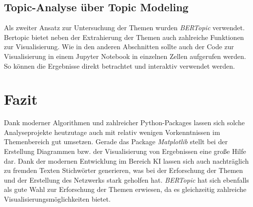 \documentclass[12pt]{article}
\begin{document}
\begin{sloppypar}
	

	\subsection{Topic-Analyse über Topic Modeling}

	Als zweiter Ansatz zur Untersuchung der Themen wurden \emph{BERTopic}
	verwendet. Bertopic bietet neben der Extrahierung der Themen auch zahlreiche
	Funktionen zur Visualisierung. Wie in den anderen Abschnitten sollte auch
	der Code zur Visualisierung in einem Jupyter Notebook in einzelnen Zellen
	aufgerufen werden. So können die Ergebnisse direkt betrachtet und interaktiv
	verwendet werden.

	

    \newpage
	\section{Fazit}

	Dank moderner Algorithmen und zahlreicher Python-Packages lassen sich solche
	Analyseprojekte heutzutage auch mit relativ wenigen Vorkenntnissen im
	Themenbereich gut umsetzen. Gerade das Package \emph{Matplotlib} stellt bei
	der Erstellung Diagrammen bzw. der Visualisierung von Ergebnissen eine große
	Hilfe dar. Dank der modernen Entwicklung im Bereich KI lassen sich auch
	nachträglich zu fremden Texten Stichwörter generieren, was bei der
	Erforschung der Themen und der Erstellung des Netzwerks stark geholfen hat.
	\emph{BERTopic} hat sich ebenfalls als gute Wahl zur Erforschung der Themen
	erwiesen, da es gleichzeitig zahlreiche Visualisierungsmöglichkeiten bietet.

\end{sloppypar}
\end{document}

